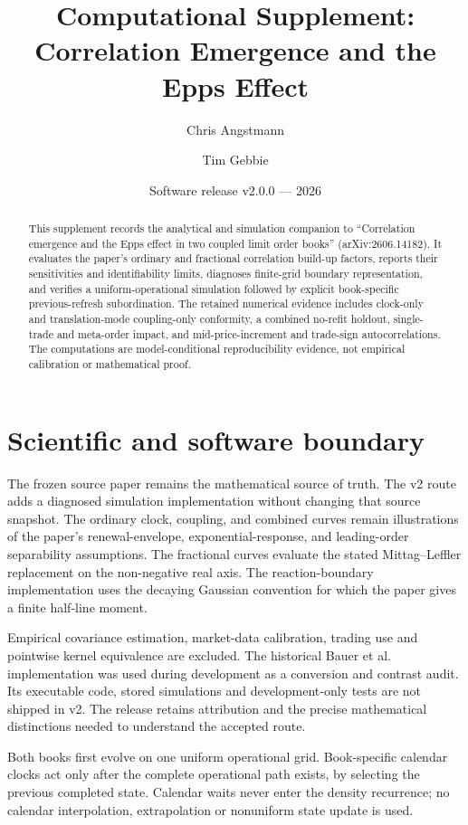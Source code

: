 \documentclass[11pt]{article}
\title{Computational Supplement:\\Correlation Emergence and the Epps Effect}
\author{Chris Angstmann \and Tim Gebbie}
\date{Software release v2.0.0 --- 2026}
\begin{document}
\maketitle

\begin{abstract}
This supplement records the analytical and simulation companion to ``Correlation emergence and the Epps effect in two coupled limit order books'' (arXiv:2606.14182). It evaluates the paper's ordinary and fractional correlation build-up factors, reports their sensitivities and identifiability limits, diagnoses finite-grid boundary representation, and verifies a uniform-operational simulation followed by explicit book-specific previous-refresh subordination. The retained numerical evidence includes clock-only and translation-mode coupling-only conformity, a combined no-refit holdout, single-trade and meta-order impact, and mid-price-increment and trade-sign autocorrelations. The computations are model-conditional reproducibility evidence, not empirical calibration or mathematical proof.
\end{abstract}

\tableofcontents

\section{Scientific and software boundary}

The frozen source paper remains the mathematical source of truth. The v2 route adds a diagnosed simulation implementation without changing that source snapshot. The ordinary clock, coupling, and combined curves remain illustrations of the paper's renewal-envelope, exponential-response, and leading-order separability assumptions. The fractional curves evaluate the stated Mittag--Leffler replacement on the non-negative real axis. The reaction-boundary implementation uses the decaying Gaussian convention for which the paper gives a finite half-line moment.

Empirical covariance estimation, market-data calibration, trading use and pointwise kernel equivalence are excluded. The historical Bauer et al. implementation was used during development as a conversion and contrast audit. Its executable code, stored simulations and development-only tests are not shipped in v2. The release retains attribution and the precise mathematical distinctions needed to understand the accepted route.

Both books first evolve on one uniform operational grid. Book-specific calendar clocks act only after the complete operational path exists, by selecting the previous completed state. Calendar waits never enter the density recurrence; no calendar interpolation, extrapolation or nonuniform state update is used.
\end{document}
